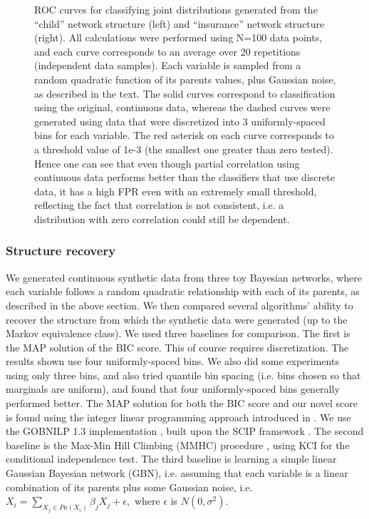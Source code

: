 \documentclass{article} %
\begin{document}
\begin{figure}[h]
\centering
    \quad
\caption{ROC curves for classifying joint distributions generated from the ``child'' network structure (left) and ``insurance'' network structure (right).  All calculations were performed using N=100 data points, and each curve corresponds to an average over 20 repetitions (independent data samples).  Each variable is sampled from a random quadratic function of its parents values, plus Gaussian noise, as described in the text.  The solid curves correspond to classification using the original, continuous data, whereas the dashed curves were generated using data that were discretized into 3 uniformly-spaced bins for each variable.  The red asterisk on each curve corresponds to a threshold value of 1e-3 (the smallest one greater than zero tested).  Hence one can see that even though partial correlation using continuous data performs better than the classifiers that use discrete data, it has a high FPR even with an extremely small threshold, reflecting the fact that correlation is not consistent, i.e. a distribution with zero correlation could still be dependent.}
\label{fig:ROC}
\end{figure}

\subsubsection{Structure recovery}
We generated continuous synthetic data from three toy Bayesian networks, where each variable follows a random quadratic relationship with each of its parents, as described in the above section.  We then compared several algorithms' ability to recover the structure from which the synthetic data were generated (up to the Markov equivalence class).  We used three baselines for comparison.  The first is the MAP solution of the BIC score.  This of course requires discretization.  The results shown use four uniformly-spaced bins.  We also did some experiments using only three bins, and also tried quantile bin spacing (i.e. bins chosen so that marginals are uniform), and found that four uniformly-spaced bins generally performed better.  The MAP solution for both the BIC score and our novel score is found using the integer linear programming approach introduced in \cite{jaakkola2010learning}.  We use the GOBNILP 1.3 implementation \cite{cussens2012bayesian}, built upon the SCIP framework \cite{achterberg2009scip}.  The second baseline is the Max-Min Hill Climbing (MMHC) procedure \cite{tsamardinos2006max}, using KCI for the conditional independence test.  The third baseline is learning a simple linear Gaussian Bayesian network (GBN), i.e. assuming that each variable is a linear combination of its parents plus some Gaussian noise, i.e. $X_i =  \sum_{X_j \in Pa(X_i)} \beta_j X_j + \epsilon,$ where $\epsilon$ is $N(0, \sigma^2)$.  
\end{document}
